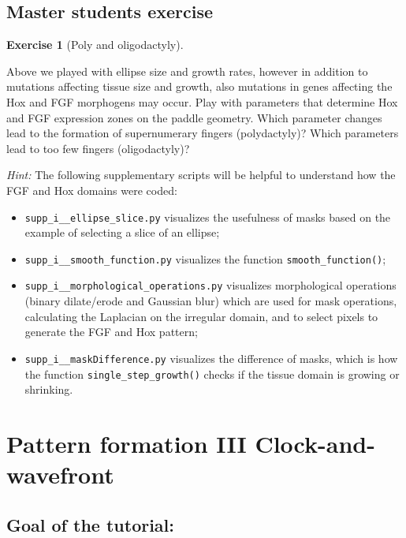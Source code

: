 \documentclass[
  letterpaper,
  DIV=11,
  numbers=noendperiod]{scrreprt}
\providecommand{\tightlist}{%
  \setlength{\itemsep}{0pt}\setlength{\parskip}{0pt}}\usepackage{longtable,booktabs,array}
\theoremstyle{definition}
\newtheorem{exercise}{Exercise}[chapter]
\theoremstyle{remark}
\begin{document}
\section{Master students exercise}\label{master-students-exercise}

\begin{exercise}[Poly and
oligodactyly]\protect\hypertarget{exr-tur}{}\label{exr-tur}

Above we played with ellipse size and growth rates, however in addition
to mutations affecting tissue size and growth, also mutations in genes
affecting the Hox and FGF morphogens may occur. Play with parameters
that determine Hox and FGF expression zones on the paddle geometry.
Which parameter changes lead to the formation of supernumerary fingers
(polydactyly)? Which parameters lead to too few fingers (oligodactyly)?

\emph{Hint:} The following supplementary scripts will be helpful to
understand how the FGF and Hox domains were coded:

\begin{itemize}
\tightlist
\item
  \texttt{supp\_i\_\_ellipse\_slice.py} visualizes the usefulness of
  masks based on the example of selecting a slice of an ellipse;
\item
  \texttt{supp\_i\_\_smooth\_function.py} visualizes the function
  \texttt{smooth\_function()};
\item
  \texttt{supp\_i\_\_morphological\_operations.py} visualizes
  morphological operations (binary dilate/erode and Gaussian blur) which
  are used for mask operations, calculating the Laplacian on the
  irregular domain, and to select pixels to generate the FGF and Hox
  pattern;
\item
  \texttt{supp\_i\_\_maskDifference.py} visualizes the difference of
  masks, which is how the function \texttt{single\_step\_growth()}
  checks if the tissue domain is growing or shrinking.
\end{itemize}

\end{exercise}

\chapter{\texorpdfstring{Pattern formation III
Clock-and-wavefront}{Pattern formation III   Clock-and-wavefront}}\label{pattern-formation-iii-clock-and-wavefront}

\section{Goal of the tutorial:}\label{goal-of-the-tutorial}
\end{document}
